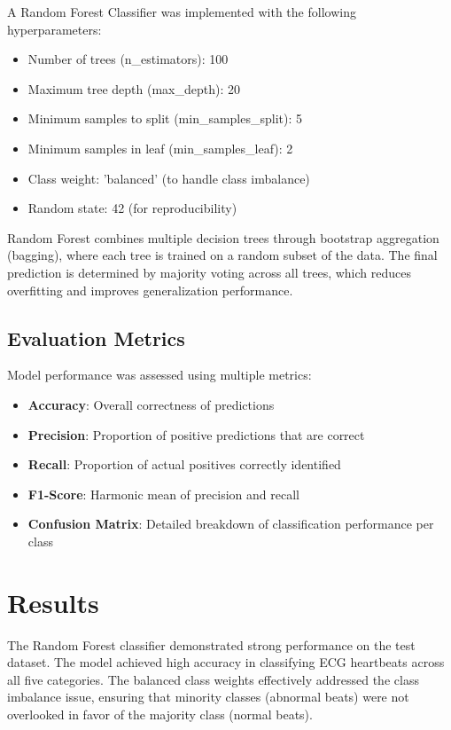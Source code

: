 \documentclass[conference]{IEEEtran}
\begin{document}
A Random Forest Classifier was implemented with the following hyperparameters:
\begin{itemize}
    \item Number of trees (n\_estimators): 100
    \item Maximum tree depth (max\_depth): 20
    \item Minimum samples to split (min\_samples\_split): 5
    \item Minimum samples in leaf (min\_samples\_leaf): 2
    \item Class weight: 'balanced' (to handle class imbalance)
    \item Random state: 42 (for reproducibility)
\end{itemize}

Random Forest combines multiple decision trees through bootstrap aggregation (bagging), where each tree is trained on a random subset of the data. The final prediction is determined by majority voting across all trees, which reduces overfitting and improves generalization performance.

\subsection{Evaluation Metrics}

Model performance was assessed using multiple metrics:
\begin{itemize}
    \item \textbf{Accuracy}: Overall correctness of predictions
    \item \textbf{Precision}: Proportion of positive predictions that are correct
    \item \textbf{Recall}: Proportion of actual positives correctly identified
    \item \textbf{F1-Score}: Harmonic mean of precision and recall
    \item \textbf{Confusion Matrix}: Detailed breakdown of classification performance per class
\end{itemize}

\section{Results}

The Random Forest classifier demonstrated strong performance on the test dataset. The model achieved high accuracy in classifying ECG heartbeats across all five categories. The balanced class weights effectively addressed the class imbalance issue, ensuring that minority classes (abnormal beats) were not overlooked in favor of the majority class (normal beats).
\end{document}
